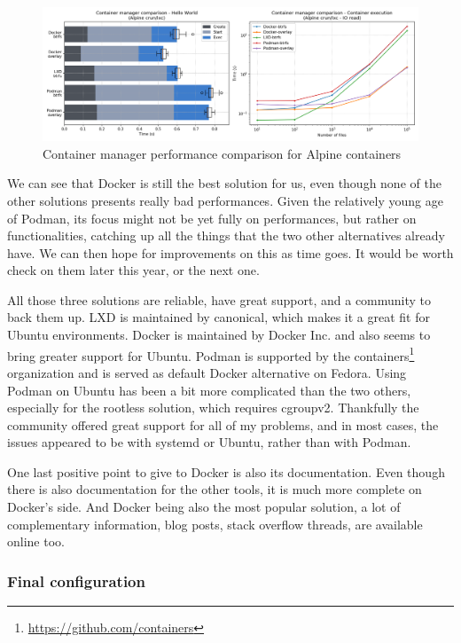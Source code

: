 \begin{figure}[h!]
  \begin{center}
    \includegraphics[width=\linewidth]{images/question-1-manager.png}
    \caption{Container manager performance comparison for Alpine containers}
    \label{fig:q1:manager}
  \end{center}
\end{figure}

We can see that Docker is still the best solution for us, even though none of the other solutions presents really bad performances.  Given the relatively young age of Podman, its focus might not be yet fully on performances, but rather on functionalities, catching up all the things that the two other alternatives already have.  We can then hope for improvements on this as time goes.  It would be worth check on them later this year, or the next one.  

All those three solutions are reliable, have great support, and a community to back them up.  LXD is maintained by canonical, which makes it a great fit for Ubuntu environments.  Docker is maintained by Docker Inc. and also seems to bring greater support for Ubuntu.  Podman is supported by the containers\footnote{\href{https://github.com/containers}{https://github.com/containers}} organization and is served as default Docker alternative on Fedora.  Using Podman on Ubuntu has been a bit more complicated than the two others, especially for the rootless solution, which requires cgroupv2.  Thankfully the community offered great support for all of my problems, and in most cases, the issues appeared to be with systemd or Ubuntu, rather than with Podman.

One last positive point to give to Docker is also its documentation.  Even though there is also documentation for the other tools, it is much more complete on Docker's side.  And Docker being also the most popular solution, a lot of complementary information, blog posts, stack overflow threads, are available online too.

\subsubsection{Final configuration}

